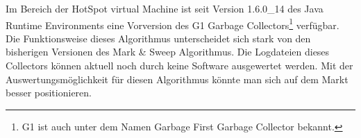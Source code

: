 Im Bereich der HotSpot virtual Machine ist seit Version 1.6.0\_14 des Java Runtime Environments eine Vorversion des G1 Garbage Collectors\footnote{G1 ist auch unter dem Namen Garbage First Garbage Collector bekannt.} verfügbar. Die Funktionsweise dieses Algorithmus unterscheidet sich stark von den bisherigen Versionen des Mark \& Sweep Algorithmus. Die Logdateien dieses Collectors können aktuell noch durch keine Software ausgewertet werden\cite{langerkreftJavaCore}. Mit der Auswertungsmöglichkeit für diesen Algorithmus könnte man sich auf dem Markt besser positionieren.






